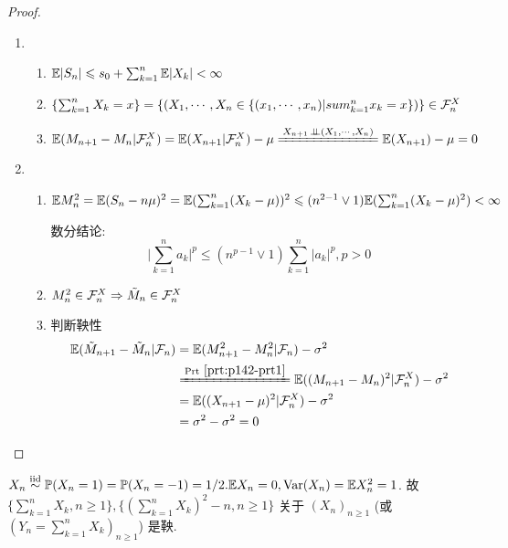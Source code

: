 \begin{proof}
    \begin{enumerate}
        \item \begin{enumerate}
            \item $\mathbb E|S_n|\leqslant s_0+\sum_{k=1}^n \mathbb E|X_k|<\infty$
            \item $\{\sum_{k=1}^n X_k=x\}=\{(X_1,\cdots,X_n\in \{(x_1,\cdots,x_n)|sum_{k=1}^n x_k=x\})\}\in \mathcal{F}_n^X$
            \item $\EE(M_{n+1}-M_n|\CF_n^X)=\EE(X_{n+1}|\CF_n^X)-\mu\xlongequal{X_{n+1}\ind (X_1,\cdots,X_n)}\EE(X_{n+1})-\mu=0$
        \end{enumerate}
        \item \begin{enumerate}
            \item $\mathbb E M_n^2=\mathbb E(S_n-n\mu)^2=\mathbb E(\sum_{k=1}^n (X_k-\mu))^2\leqslant (n^{2-1}\lor 1)\mathbb E(\sum_{k=1}^n(X_k-\mu)^2)<\infty$
            
            数分结论:
            \[
            \boxed{
                \bigg|
                    \sum_{k=1}^n a_k
                \bigg|^p\leq
                (n^{p-1}\lor 1)\sum_{k=1}^n |a_k|^p, p>0
            }
            \]
            \item $M_n^2\in\mathcal{F}_n^X\Rightarrow \tilde{M}_n\in\mathcal{F}_n^X$
            \item 判断鞅性
            \[
            \begin{aligned}
                \EE(\tilde{M}_{n+1}-\tilde{M}_n|\CF_n) &=\EE(M_{n+1}^2-M_n^2|\CF_n)-\sigma^2\\
                &\xlongequal{\text{Prt}\ \ref{prt:p142-prt1}} \EE((M_{n+1}-M_n)^2|\CF_n^X)-\sigma^2\\
                &=\EE((X_{n+1}-\mu)^2|\CF_n^X)-\sigma^2\\
                &=\sigma^2-\sigma^2=0
            \end{aligned}
            \]
        \end{enumerate}
    \end{enumerate}
\end{proof}

\begin{example}[简单对称随机游走]
    $X_n\overset{\text{iid}}{\sim} \mathbb{P}(X_n=1)=\mathbb{P}(X_n=-1)=1/2. \mathbb E X_n=0, \operatorname{Var}(X_n)=\mathbb E X_n^2=1$. 故 $\{\sum_{k=1}^n X_k,n\geq 1\}, \{(\sum_{k=1}^n X_k)^2-n,n\geq 1\}$ 关于 $(X_n)_{n\geq 1}$ (或 $(Y_n=\sum_{k=1}^n X_k)_{n\geq 1}$) 是鞅.
\end{example}

